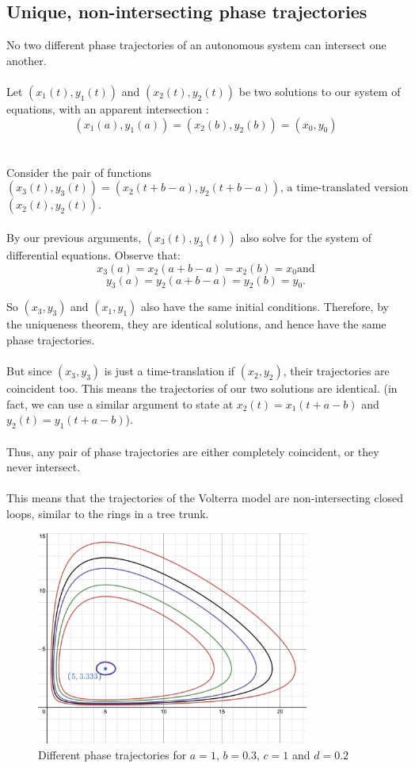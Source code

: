 \documentclass{article}
\begin{document}
\subsection{Unique, non-intersecting phase trajectories}

No two different phase trajectories of an autonomous system can intersect one another. 
\\
\\
Let $(x_1(t), y_1(t))$ and $(x_2(t), y_2(t))$ be two solutions to our system of equations, with an apparent intersection : $$(x_1(a), y_1(a)) = (x_2(b), y_2(b)) = (x_0, y_0)$$
\\
\\
Consider the pair of functions $$(x_3(t), y_3(t)) = (x_2(t+b-a), y_2(t+b-a)) \text{, a time-translated version }$$ $(x_2(t), y_2(t))$. 
\\
\\
By our previous arguments, $(x_3(t), y_3(t))$ also solve for the system of differential equations. Observe that:
$$x_3(a) = x_2(a + b - a) = x_2(b) = x_0 \text{and}$$
$$y_3(a) = y_2(a + b - a) = y_2(b) = y_0.$$

So $(x_3, y_3)$ and $(x_1, y_1)$ also have the same initial conditions. Therefore, by the uniqueness theorem, they are identical solutions, and hence have the same phase trajectories.
\\
\\
But since $(x_3, y_3)$ is just a time-translation if $(x_2, y_2)$, their trajectories are coincident too. This means the trajectories of our two solutions are identical. (in fact, we can use a similar argument to state at $x_2(t) = x_1(t + a - b)$ and $y_2(t) = y_1(t + a - b)$).
\\
\\
Thus, any pair of phase trajectories are either completely coincident, or they never intersect.
\\
\\
This means that the trajectories of the Volterra model are non-intersecting closed loops, similar to the rings in a tree trunk.

\begin{figure}[h]
    \centering
    \includegraphics[width = 0.8\textwidth]{phase.png}
    \caption{Different phase trajectories for $a = 1$, $b = 0.3$, $c =1$ and $d = 0.2$}
    \label{}
\end{figure}
\end{document}
